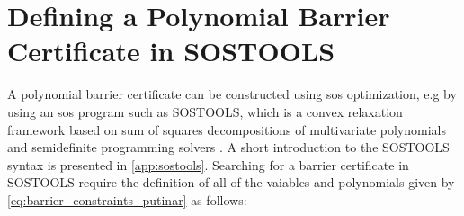  
	

\section{Defining a Polynomial Barrier Certificate in SOSTOOLS}\label{sec:app_sostools_barrier_search}

A polynomial barrier certificate can be constructed using \gls{sos} optimization, e.g by using an \gls{sos} program such as SOSTOOLS, which is a convex relaxation framework based on sum of squares decompositions of multivariate polynomials and semidefinite programming solvers \citep{bib:prajna_framework}. A short introduction to the SOSTOOLS syntax is presented in \autoref{app:sostools}.
Searching for a barrier certificate in SOSTOOLS require the definition of all of the vaiables and polynomials given by \autoref{eq:barrier_constraints_putinar} as follows:

